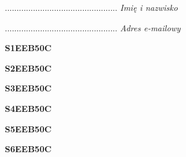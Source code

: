 \begin{turn}{90}\begin{minipage}{\linewidth} \vspace{20mm} ................................................  \textit{Imię i nazwisko}\end{minipage}\end{turn}

\begin{turn}{90}\begin{minipage}{\linewidth} \vspace{20mm} ................................................  \textit{Adres e-mailowy}\end{minipage}\end{turn}

\begin{turn}{90}\huge \begin{minipage}{\linewidth} \vspace{10mm}\textbf{S1EEB50C}\end{minipage}\end{turn}

\begin{turn}{90}\huge \begin{minipage}{\linewidth} \vspace{10mm}\textbf{S2EEB50C}\end{minipage}\end{turn}

\begin{turn}{90}\huge \begin{minipage}{\linewidth} \vspace{10mm}\textbf{S3EEB50C}\end{minipage}\end{turn}

\begin{turn}{90}\huge \begin{minipage}{\linewidth} \vspace{10mm}\textbf{S4EEB50C}\end{minipage}\end{turn}

\begin{turn}{90}\huge \begin{minipage}{\linewidth} \vspace{10mm}\textbf{S5EEB50C}\end{minipage}\end{turn}

\begin{turn}{90}\huge \begin{minipage}{\linewidth} \vspace{10mm}\textbf{S6EEB50C}\end{minipage}\end{turn}

